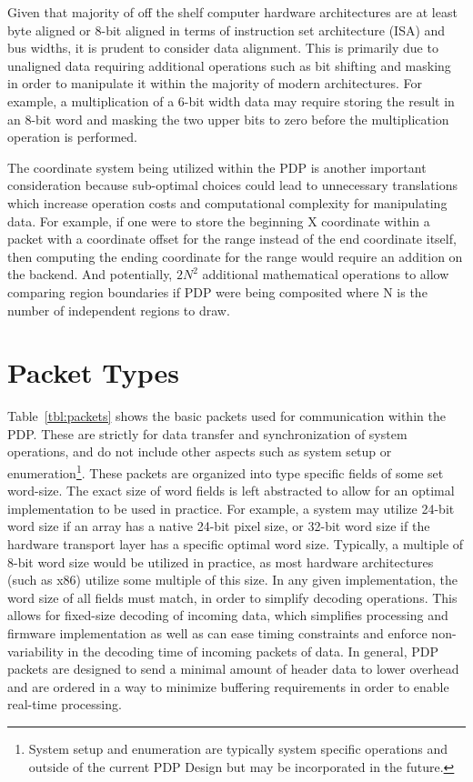     Given that majority of off the shelf computer hardware architectures are at least byte aligned or 8-bit aligned in terms of instruction set architecture (ISA) and bus widths, it is prudent to consider data alignment. This is primarily due to unaligned data requiring additional operations such as bit shifting and masking in order to manipulate it within the majority of modern architectures. For example, a multiplication of a 6-bit width data may require storing the result in an 8-bit word and masking the two upper bits to zero before the multiplication operation is performed.

    The coordinate system being utilized within the PDP is another important consideration because sub-optimal choices could lead to unnecessary translations which increase operation costs and computational complexity for manipulating data. For example, if one were to store the beginning X coordinate within a packet with a coordinate offset for the range instead of the end coordinate itself, then computing the ending coordinate for the range would require an addition on the backend. And potentially, $2N^2$ additional mathematical operations to allow comparing region boundaries if PDP were being composited where N is the number of independent regions to draw.

\section{Packet Types}
    \label{sec:packet_types}
    Table~\ref{tbl:packets} shows the basic packets used for communication within the PDP. These are strictly for data transfer and synchronization of system operations, and do not include other aspects such as system setup or enumeration\footnote{System setup and enumeration are typically system specific operations and outside of the current PDP Design but may be incorporated in the future.}. These packets are organized into type specific fields of some set word-size. The exact size of word fields is left abstracted to allow for an optimal implementation to be used in practice. For example, a system may utilize 24-bit word size if an array has a native 24-bit pixel size, or 32-bit word size if the hardware transport layer has a specific optimal word size. Typically, a multiple of 8-bit word size would be utilized in practice, as most hardware architectures (such as x86) utilize some multiple of this size\cite{HennessyEtAl2012}. In any given implementation, the word size of all fields must match, in order to simplify decoding operations. This allows for fixed-size decoding of incoming data, which simplifies processing and firmware implementation as well as can ease timing constraints and enforce non-variability in the decoding time of incoming packets of data. In general, PDP packets are designed to send a minimal amount of header data to lower overhead and are ordered in a way to minimize buffering requirements in order to enable real-time processing.

